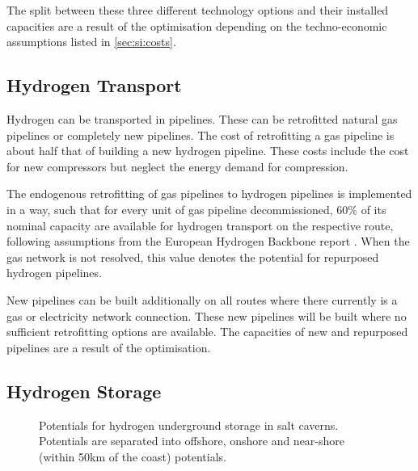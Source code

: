 The split between these three different technology
options and their installed capacities are a result of the optimisation
depending on the techno-economic assumptions listed in \cref{sec:si:costs}.

\subsection{Hydrogen Transport}
\label{sec:si:h2:transport}

Hydrogen can be transported in pipelines. These can be retrofitted natural gas
pipelines or completely new pipelines. The cost of retrofitting a gas pipeline
is about half that of building a new hydrogen pipeline. These costs include the
cost for new compressors but neglect the energy demand for compression.

The endogenous retrofitting of gas pipelines to hydrogen pipelines is
implemented in a way, such that for every unit of gas pipeline decommissioned,
60\% of its nominal capacity are available for hydrogen transport on the
respective route, following assumptions from the European Hydrogen Backbone
report . When the gas network is not
resolved, this value denotes the potential for repurposed hydrogen pipelines.

New pipelines can be built additionally on all routes where there currently is a
gas or electricity network connection. These new pipelines will be built where
no sufficient retrofitting options are available. The capacities of new and
repurposed pipelines are a result of the optimisation.

\subsection{Hydrogen Storage}
\label{sec:si:h2:storage}

\begin{figure}
    \centering
    \caption{Potentials for hydrogen underground storage in salt caverns. Potentials are separated into offshore, onshore and near-shore (within 50km of the coast) potentials.}
    \label{fig:clustered-caverns}
\end{figure}

